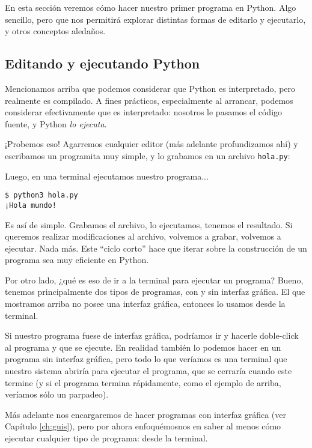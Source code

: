 En esta sección veremos cómo hacer nuestro primer programa en Python. Algo sencillo, pero que nos permitirá explorar distintas formas de editarlo y ejecutarlo, y otros conceptos aledaños.


\subsection{Editando y ejecutando Python}

Mencionamos arriba que podemos considerar que Python es interpretado, pero realmente es compilado. A fines prácticos, especialmente al arrancar, podemos considerar efectivamente que es interpretado: nosotros le pasamos el código fuente, y Python \textit{lo ejecuta}.

¡Probemos eso! Agarremos cualquier editor (más adelante profundizamos ahí) y escribamos un programita muy simple, y lo grabamos en un archivo \texttt{hola.py}:


Luego, en una terminal ejecutamos nuestro programa...

\begin{verbatim}
$ python3 hola.py
¡Hola mundo!
\end{verbatim}

Es así de simple. Grabamos el archivo, lo ejecutamos, tenemos el resultado. Si queremos realizar modificaciones al archivo, volvemos a grabar, volvemos a ejecutar. Nada más. Este ``ciclo corto'' hace que iterar sobre la construcción de un programa sea muy eficiente en Python.

Por otro lado, ¿qué es eso de ir a la terminal para ejecutar un programa? Bueno, tenemos principalmente dos tipos de programas, con y sin interfaz gráfica. El que mostramos arriba no posee una interfaz gráfica, entonces lo usamos desde la terminal. 

Si nuestro programa fuese de interfaz gráfica, podríamos ir y hacerle doble-click al programa y que se ejecute. En realidad también lo podemos hacer en un programa sin interfaz gráfica, pero todo lo que veríamos es una terminal que nuestro sistema abriría para ejecutar el programa, que se cerraría cuando este termine (y si el programa termina rápidamente, como el ejemplo de arriba, veríamos sólo un parpadeo).

Más adelante nos encargaremos de hacer programas con interfaz gráfica (ver Capítulo \ref{ch:guis}), pero por ahora enfoquémosnos en saber al menos cómo ejecutar cualquier tipo de programa: desde la terminal.


